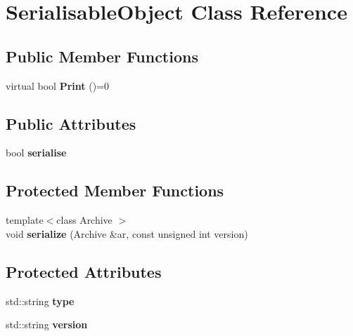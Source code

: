 \hypertarget{classSerialisableObject}{\section{Serialisable\-Object Class Reference}
\label{classSerialisableObject}
}
\subsection*{Public Member Functions}
\begin{DoxyCompactItemize}
\item 
\hypertarget{classSerialisableObject_a9055c98969917d4c652eefdc924b6b75}{virtual bool {\bfseries Print} ()=0}\label{classSerialisableObject_a9055c98969917d4c652eefdc924b6b75}

\end{DoxyCompactItemize}
\subsection*{Public Attributes}
\begin{DoxyCompactItemize}
\item 
\hypertarget{classSerialisableObject_a4635f9e80623df463bcca2c88b10fc67}{bool {\bfseries serialise}}\label{classSerialisableObject_a4635f9e80623df463bcca2c88b10fc67}

\end{DoxyCompactItemize}
\subsection*{Protected Member Functions}
\begin{DoxyCompactItemize}
\item 
\hypertarget{classSerialisableObject_a7c9ec7bf87b5921957768f4467c6143a}{{\footnotesize template$<$class Archive $>$ }\\void {\bfseries serialize} (Archive \&ar, const unsigned int version)}\label{classSerialisableObject_a7c9ec7bf87b5921957768f4467c6143a}

\end{DoxyCompactItemize}
\subsection*{Protected Attributes}
\begin{DoxyCompactItemize}
\item 
\hypertarget{classSerialisableObject_a893f965e41ad7f09b4066cb07fecef8e}{std\-::string {\bfseries type}}\label{classSerialisableObject_a893f965e41ad7f09b4066cb07fecef8e}

\item 
\hypertarget{classSerialisableObject_ade0071c238a09193b37a2750d2b50b18}{std\-::string {\bfseries version}}\label{classSerialisableObject_ade0071c238a09193b37a2750d2b50b18}

\end{DoxyCompactItemize}
